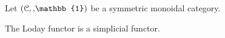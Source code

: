   \begin{defn}\label{def_loday_functor_in_symmetric_monoidal_category}
    Let $(\mathcal{C},\smash, \mathbb{1})$ be a symmetric monoidal category.\\
  \end{defn}

  \begin{lem}\label{lem_loday_functor_is_simplicial}
    The Loday functor is a simplicial functor.\\
  \end{lem}
